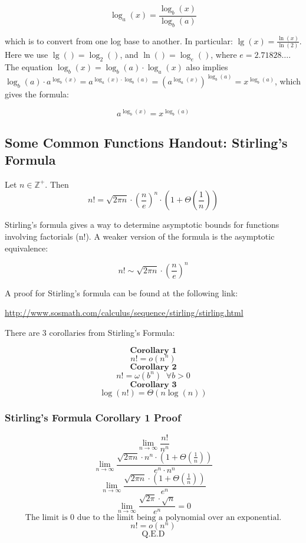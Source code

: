 \documentclass{article}
\begin{document}
$$\log_{a}(x) = \frac{\log_{b}(x)}{\log_{b}(a)}$$

which is to convert from one log base to another. In particular: $\lg(x) = \frac{\ln(x)}{\ln(2)}$. Here we use $\lg() = \log_{2}()$, and $\ln() = \log_{e}()$, where $e = 2.71828\dots$. The equation $\log_{b}(x) = \log_{b}(a) \cdot \log_{a}(x)$ also implies $\log_{b}(a) \cdot a^{\log_{b}(x)} = a^{\log_{a}(x) \cdot \log_{b}(a)} = (a^{\log_{a}(x)})^{\log_{b}(a)} = x^{\log_{b}(a)}$, which gives the formula:

$$a^{\log_{b}(x)} = x^{\log_{b}(a)}$$

\subsection{Some Common Functions Handout: Stirling's Formula}
Let $n \in \mathbb{Z}^+$. Then 
$$n! = \sqrt{2\pi n}\cdot  (\frac{n}{e})^n \cdot (1 + \Theta(\frac{1}{n}))$$

Stirling's formula gives a way to determine asymptotic bounds for functions involving factorials (n!). A weaker version of the formula is the asymptotic equivalence: 

$$n! \sim \sqrt{2\pi n}\cdot (\frac{n}{e})^n$$

A proof for Stirling's formula can be found at the following link:

\href{http://www.sosmath.com/calculus/sequence/stirling/stirling.html}{http://www.sosmath.com/calculus/sequence/stirling/stirling.html}

There are 3 corollaries from Stirling's Formula:

$$\textbf{Corollary 1}$$
$$n! = o(n^n)$$
$$\textbf{Corollary 2}$$
$$n! = \omega(b^n) \;\; \forall b > 0$$
$$\textbf{Corollary 3}$$
$$\log(n!) = \Theta(n\log(n))$$

\subsubsection{Stirling's Formula Corollary 1 Proof}
$$\lim_{n \rightarrow \infty} \frac{n!}{n^n}$$
$$\lim_{n \rightarrow \infty} \frac{\sqrt{2\pi n} \cdot n^n \cdot (1 + \Theta(\frac{1}{n}))}{e^n \cdot n^n}$$
$$\lim_{n \rightarrow \infty} \frac{\sqrt{2\pi n} \cdot (1 + \Theta(\frac{1}{n}))}{e^n}$$
$$\lim_{n \rightarrow \infty} \frac{\sqrt{2\pi} \cdot \sqrt{n}}{e^n} = 0$$
$$\text{The limit is 0 due to the limit being a polynomial over an exponential.}$$
$$n! = o(n^n)$$
$$\text{Q.E.D}$$
\end{document}

